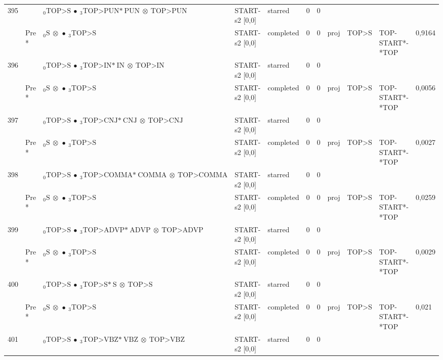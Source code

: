 \documentclass[10pt]{article}
\begin{document}
\begin{longtable}[htbp]{lllllllllll}
395 & & $ {}_0 \textrm{TOP>S} \  \bullet \ {}_{3} \textrm{TOP>PUN*} \ \textrm{PUN} \  \otimes \ \textrm{TOP>PUN} $ & START-s2 [0,0] & starred & 0 & 0 & & & & \\ 
 & Pre *& $ {}_0 \textrm{S} \  \otimes \  \bullet \ {}_{3} \textrm{TOP>S} $ & START-s2 [0,0] & completed & 0 & 0 & proj & TOP>S & TOP-START*-*TOP & 0,9164 \\ 
396 & & $ {}_0 \textrm{TOP>S} \  \bullet \ {}_{3} \textrm{TOP>IN*} \ \textrm{IN} \  \otimes \ \textrm{TOP>IN} $ & START-s2 [0,0] & starred & 0 & 0 & & & & \\ 
 & Pre *& $ {}_0 \textrm{S} \  \otimes \  \bullet \ {}_{3} \textrm{TOP>S} $ & START-s2 [0,0] & completed & 0 & 0 & proj & TOP>S & TOP-START*-*TOP & 0,0056 \\ 
397 & & $ {}_0 \textrm{TOP>S} \  \bullet \ {}_{3} \textrm{TOP>CNJ*} \ \textrm{CNJ} \  \otimes \ \textrm{TOP>CNJ} $ & START-s2 [0,0] & starred & 0 & 0 & & & & \\ 
 & Pre *& $ {}_0 \textrm{S} \  \otimes \  \bullet \ {}_{3} \textrm{TOP>S} $ & START-s2 [0,0] & completed & 0 & 0 & proj & TOP>S & TOP-START*-*TOP & 0,0027 \\ 
398 & & $ {}_0 \textrm{TOP>S} \  \bullet \ {}_{3} \textrm{TOP>COMMA*} \ \textrm{COMMA} \  \otimes \ \textrm{TOP>COMMA} $ & START-s2 [0,0] & starred & 0 & 0 & & & & \\ 
 & Pre *& $ {}_0 \textrm{S} \  \otimes \  \bullet \ {}_{3} \textrm{TOP>S} $ & START-s2 [0,0] & completed & 0 & 0 & proj & TOP>S & TOP-START*-*TOP & 0,0259 \\ 
399 & & $ {}_0 \textrm{TOP>S} \  \bullet \ {}_{3} \textrm{TOP>ADVP*} \ \textrm{ADVP} \  \otimes \ \textrm{TOP>ADVP} $ & START-s2 [0,0] & starred & 0 & 0 & & & & \\ 
 & Pre *& $ {}_0 \textrm{S} \  \otimes \  \bullet \ {}_{3} \textrm{TOP>S} $ & START-s2 [0,0] & completed & 0 & 0 & proj & TOP>S & TOP-START*-*TOP & 0,0029 \\ 
400 & & $ {}_0 \textrm{TOP>S} \  \bullet \ {}_{3} \textrm{TOP>S*} \ \textrm{S} \  \otimes \ \textrm{TOP>S} $ & START-s2 [0,0] & starred & 0 & 0 & & & & \\ 
 & Pre *& $ {}_0 \textrm{S} \  \otimes \  \bullet \ {}_{3} \textrm{TOP>S} $ & START-s2 [0,0] & completed & 0 & 0 & proj & TOP>S & TOP-START*-*TOP & 0,021 \\ 
401 & & $ {}_0 \textrm{TOP>S} \  \bullet \ {}_{3} \textrm{TOP>VBZ*} \ \textrm{VBZ} \  \otimes \ \textrm{TOP>VBZ} $ & START-s2 [0,0] & starred & 0 & 0 & & & & \\ 

\end{longtable}
\end{document}
